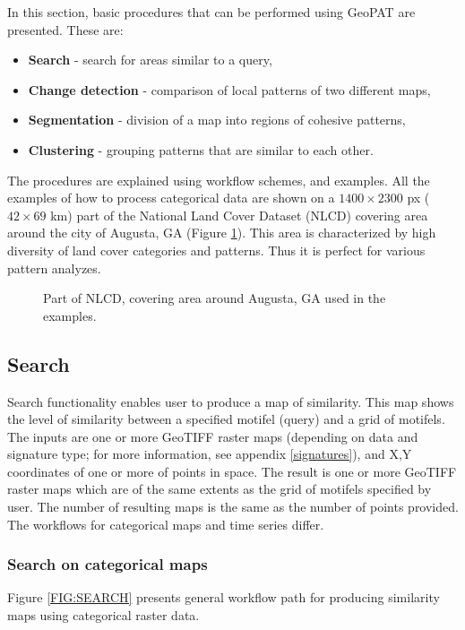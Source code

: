 \documentclass[12pt,margin=0.5in]{article}
\begin{document}
In this section, basic procedures that can be performed using GeoPAT are presented. These are: 
\begin{itemize}
	\item {\bf Search} - search for areas similar to a query,
	\item {\bf Change detection} - comparison of local patterns of two different maps,
	\item {\bf Segmentation} - division of a map into regions of cohesive patterns,
	\item {\bf Clustering} - grouping patterns that are similar to each other.
\end{itemize}
The procedures are explained using workflow schemes, and examples. All the examples of how to process categorical data are shown on a $1400\times 2300$ px ($42\times 69$ km) part of the National Land Cover Dataset (NLCD) covering area around the city of Augusta, GA (Figure \ref{FIG:AUGUSTA}). This area is characterized by high diversity of land cover categories and patterns. Thus it is perfect for various pattern analyzes. 

\begin{figure}[h]
	\centering
	\caption{Part of NLCD, covering area around Augusta, GA used in the examples.}
	\label{FIG:AUGUSTA}
\end{figure}

\FloatBarrier

\subsection{Search}

Search functionality enables user to produce a map of similarity. This map shows the level of similarity between a specified motifel (query) and a grid of motifels. The inputs are one or more GeoTIFF raster maps (depending on data and signature type; for more information, see appendix \ref{signatures}), and X,Y coordinates of one or more of points in space. The result is one or more GeoTIFF raster maps which are of the same extents as the grid of motifels specified by user. The number of resulting maps is the same as the number of points provided. The workflows for categorical maps and time series differ.

\subsubsection{Search on categorical maps}
Figure \ref{FIG:SEARCH} presents general workflow path for producing similarity maps using categorical raster data. 
\end{document}
